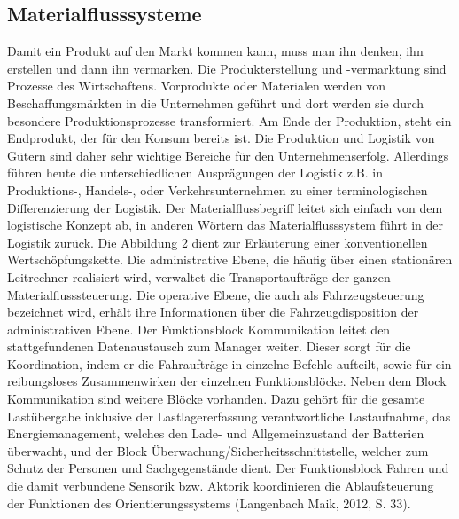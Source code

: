 \begin{itemize}
\subsection{Materialflusssysteme}
Damit ein Produkt auf den Markt kommen kann, muss man ihn denken, ihn erstellen und dann ihn vermarken. Die Produkterstellung und -vermarktung sind Prozesse des Wirtschaftens. Vorprodukte oder Materialen werden von Beschaffungsm\"arkten in die Unternehmen gef\"uhrt und dort werden sie durch besondere Produktionsprozesse transformiert. Am Ende der Produktion, steht ein Endprodukt, der f\"ur den Konsum bereits ist. 
Die Produktion und Logistik von G\"utern sind daher sehr wichtige Bereiche f\"ur den Unternehmenserfolg. Allerdings f\"uhren heute die unterschiedlichen Auspr\"agungen der Logistik z.B. in Produktions-, Handels-, oder Verkehrsunternehmen zu einer terminologischen Differenzierung der Logistik. Der Materialflussbegriff leitet sich einfach von dem logistische Konzept ab, in anderen W\"ortern das Materialflusssystem f\"uhrt in der Logistik zur\"uck. Die Abbildung 2 dient zur Erl\"auterung einer konventionellen Wertsch\"opfungskette. 
Die administrative Ebene, die h\"aufig \"uber einen station\"aren Leitrechner realisiert wird, verwaltet die Transportauftr\"age der ganzen Materialflusssteuerung.
Die operative Ebene, die auch als Fahrzeugsteuerung bezeichnet wird, erh\"alt ihre Informationen \"uber die Fahrzeugdisposition der administrativen Ebene.
Der Funktionsblock Kommunikation leitet den stattgefundenen Datenaustausch zum Manager weiter.
Dieser sorgt f\"ur die Koordination, indem er die Fahrauftr\"age in einzelne Befehle aufteilt, sowie f\"ur ein reibungsloses Zusammenwirken der einzelnen Funktionsbl\"ocke.
Neben dem Block Kommunikation sind weitere Bl\"ocke vorhanden.
Dazu geh\"ort f\"ur die gesamte Last\"ubergabe inklusive der Lastlagererfassung verantwortliche Lastaufnahme, das Energiemanagement, welches den Lade- und Allgemeinzustand der Batterien \"uberwacht, und der Block \"Uberwachung/Sicherheitsschnittstelle, welcher zum Schutz der Personen und Sachgegenst\"ande dient.
Der Funktionsblock Fahren und die damit verbundene Sensorik bzw. Aktorik koordinieren die Ablaufsteuerung der Funktionen des Orientierungssystems (Langenbach Maik, 2012, S. 33).


\end{itemize}
